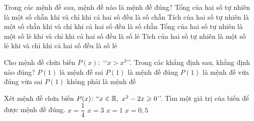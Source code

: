 \begin{ex}%
	Trong các mệnh đề sau, mệnh đề nào là mệnh đề đúng?
	\choice
	{Tổng của hai số tự nhiên là một số chẵn khi và chỉ khi cả hai số đều là số chẵn}
	{Tích của hai số tự nhiên là một số chẵn khi và chỉ khi cả hai số đều là số chẵn}
	{Tổng của hai số tự nhiên là một số lẻ khi và chỉ khi cả hai số đều là số lẻ}
	{\True Tích của hai số tự nhiên là một số lẻ khi và chỉ khi cả hai số đều là số lẻ}
\end{ex}
\begin{ex}%
	Cho mệnh đề chứa biến $P(x)\colon$ \lq\lq$x>x^3$\rq\rq. Trong các khẳng định sau, khẳng định nào đúng?
	\choice
	{\True $P(1)$ là mệnh đề sai}
	{$P(1)$ là mệnh đề đúng}
	{$P(1)$ là mệnh đề vừa đúng vừa sai}
	{$P(1)$ không phải là mệnh đề}
\end{ex}
\begin{ex}%
	Xét mệnh đề chứa biến $P(x)\colon\lq\lq x\in\mathbb{R},\ x^2-2x\geqslant 0$\rq\rq. Tìm một giá trị của biến để được mệnh đề đúng.
	\choice
	{$ x=\dfrac{1}{4}$}
	{\True $ x=3$}
	{$ x=1$}
	{$ x=0{,}5$}
\end{ex}

